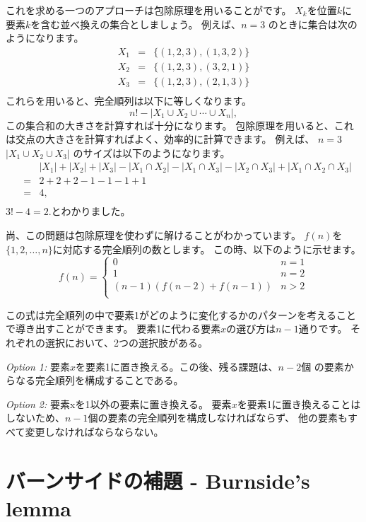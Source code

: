 これを求める一つのアプローチは包除原理を用いることがです。
$X_k$を位置$k$に要素$k$を含む並べ換えの集合としましょう。
例えば、$n = 3$ のときに集合は次のようになります。
\[
\begin{array}{lcl}
X_1 & = & \{(1,2,3),(1,3,2)\} \\
X_2 & = & \{(1,2,3),(3,2,1)\} \\
X_3 & = & \{(1,2,3),(2,1,3)\} \\
\end{array}
\]
これらを用いると、完全順列は以下に等しくなります。
\[ n! - |X_1 \cup X_2 \cup \cdots \cup X_n|, \]
この集合和の大きさを計算すれば十分になります。
包除原理を用いると、これは交点の大きさを計算すればよく、効率的に計算できます。
例えば、 $n=3$
$|X_1 \cup X_2 \cup X_3|$ のサイズは以下のようになります。
\[
\begin{array}{lcl}
 & & |X_1| + |X_2| + |X_3| - |X_1 \cap X_2|  - |X_1 \cap X_3|  - |X_2 \cap X_3| + |X_1 \cap X_2 \cap X_3| \\
 & = & 2+2+2-1-1-1+1 \\
 & = & 4, \\
\end{array}
\]
$3!-4=2$.とわかりました。

尚、この問題は包除原理を使わずに解けることがわかっています。
$f(n)$を$\{1,2,\ldots,n\}$に対応する完全順列の数とします。
この時、以下のように示せます。
\begin{equation*}
    f(n) = \begin{cases}
               0               & n = 1\\
               1               & n = 2\\
               (n-1)(f(n-2) + f(n-1)) & n>2 \\
           \end{cases}
\end{equation*}


この式は完全順列の中で要素1がどのように変化するかのパターンを考えることで導き出すことができます。
要素1に代わる要素$x$の選び方は$n - 1$通りです。
それぞれの選択において、2つの選択肢がある。

\textit{Option 1:} 要素$x$を要素1に置き換える。この後、残る課題は、$n - 2$個
の要素からなる完全順列を構成することである。

\textit{Option 2:} 要素xを1以外の要素に置き換える。 
要素$x$を要素1に置き換えることはしないため、$n - 1$個の要素の完全順列を構成しなければならず、
他の要素もすべて変更しなければならならない。

\section{バーンサイドの補題 - Burnside's lemma}

